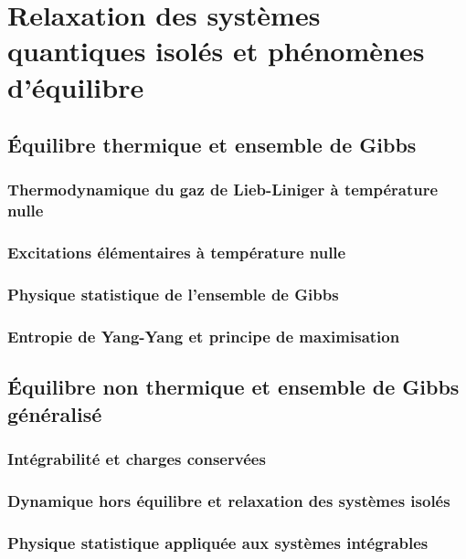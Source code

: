 \part{Relaxation des systèmes quantiques isolés et phénomènes d'équilibre}

\chapter{Équilibre thermique et ensemble de Gibbs}
\minitoc
\section{Thermodynamique du gaz de Lieb-Liniger à température nulle}


\section{Excitations élémentaires à température nulle}
%
\section{Physique statistique de l’ensemble de Gibbs}
%


\section{Entropie de Yang-Yang et principe de maximisation}

\chapter{Équilibre non thermique et ensemble de Gibbs généralisé}
\minitoc
\section{Intégrabilité et charges conservées}
\section{Dynamique hors équilibre et relaxation des systèmes isolés}
\section{Physique statistique appliquée aux systèmes intégrables}

